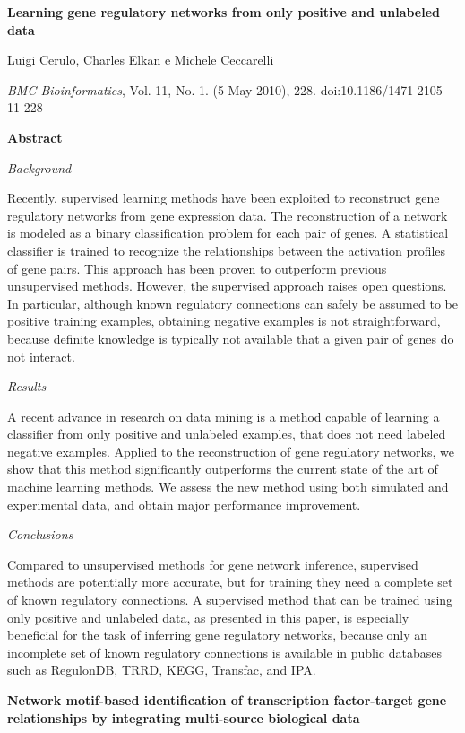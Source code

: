 {\Large \bf Learning gene regulatory networks from only positive and unlabeled data}

Luigi Cerulo, Charles Elkan e Michele Ceccarelli

{\it BMC Bioinformatics}, Vol. 11, No. 1. (5 May 2010), 228. doi:10.1186/1471-2105-11-228

{\large \bf Abstract}

{\it Background}

Recently, supervised learning methods have been exploited to reconstruct gene regulatory networks from gene expression data. The reconstruction of a network is modeled as a binary classification problem for each pair of genes. A statistical classifier is trained to recognize the relationships between the activation profiles of gene pairs. This approach has been proven to outperform previous unsupervised methods. However, the supervised approach raises open questions. In particular, although known regulatory connections can safely be assumed to be positive training examples, obtaining negative examples is not straightforward, because definite knowledge is typically not available that a given pair of genes do not interact.

{\it Results}

A recent advance in research on data mining is a method capable of learning a classifier from only positive and unlabeled examples, that does not need labeled negative examples. Applied to the reconstruction of gene regulatory networks, we show that this method significantly outperforms the current state of the art of machine learning methods. We assess the new method using both simulated and experimental data, and obtain major performance improvement.

{\it Conclusions}

Compared to unsupervised methods for gene network inference, supervised methods are potentially more accurate, but for training they need a complete set of known regulatory connections. A supervised method that can be trained using only positive and unlabeled data, as presented in this paper, is especially beneficial for the task of inferring gene regulatory networks, because only an incomplete set of known regulatory connections is available in public databases such as RegulonDB, TRRD, KEGG, Transfac, and IPA.



{\Large \bf Network motif-based identification of transcription factor-target gene relationships by integrating multi-source biological data}

